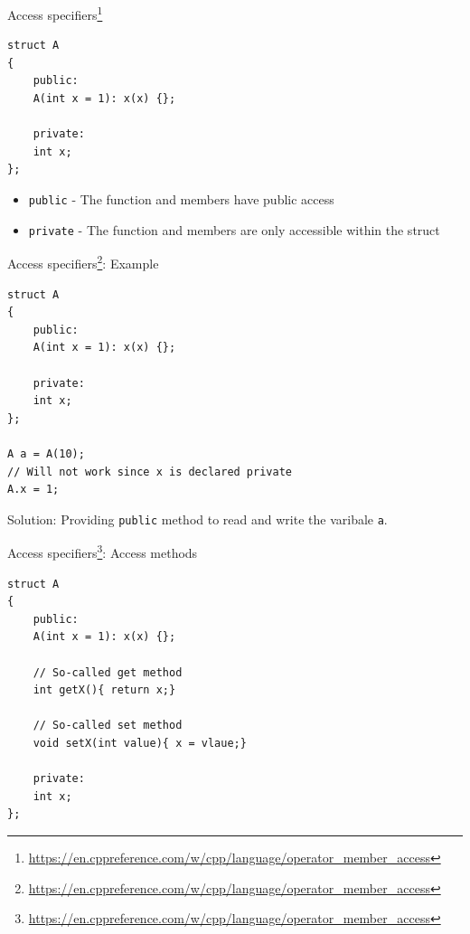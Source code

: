 \documentclass[\classoption]{beamer}
\begin{document}
\begin{frame}[fragile]{Access specifiers\footnote{\tiny\url{https://en.cppreference.com/w/cpp/language/operator_member_access}}}

\begin{lstlisting}
struct A
{
    public:
    A(int x = 1): x(x) {};
    
    private:
    int x;
};
\end{lstlisting}

\begin{itemize}
\item \lstinline|public| - The function and members have public access
\item \lstinline|private| - The function and members are only accessible within the struct
\end{itemize}

\end{frame}

\begin{frame}[fragile]{Access specifiers\footnote{\tiny\url{https://en.cppreference.com/w/cpp/language/operator_member_access}}: Example}

\begin{lstlisting}
struct A
{
    public:
    A(int x = 1): x(x) {};
    
    private:
    int x;
};

A a = A(10);
// Will not work since x is declared private
A.x = 1;

\end{lstlisting}

Solution: Providing \lstinline|public| method to read and write the varibale \lstinline|a|.
\end{frame}

\begin{frame}[fragile]{Access specifiers\footnote{\tiny\url{https://en.cppreference.com/w/cpp/language/operator_member_access}}: Access methods}

\begin{lstlisting}
struct A
{
    public:
    A(int x = 1): x(x) {};
    
    // So-called get method
    int getX(){ return x;}
    
    // So-called set method
    void setX(int value){ x = vlaue;}
    
    private:
    int x;
};

\end{lstlisting}

\end{frame}
\end{document}
